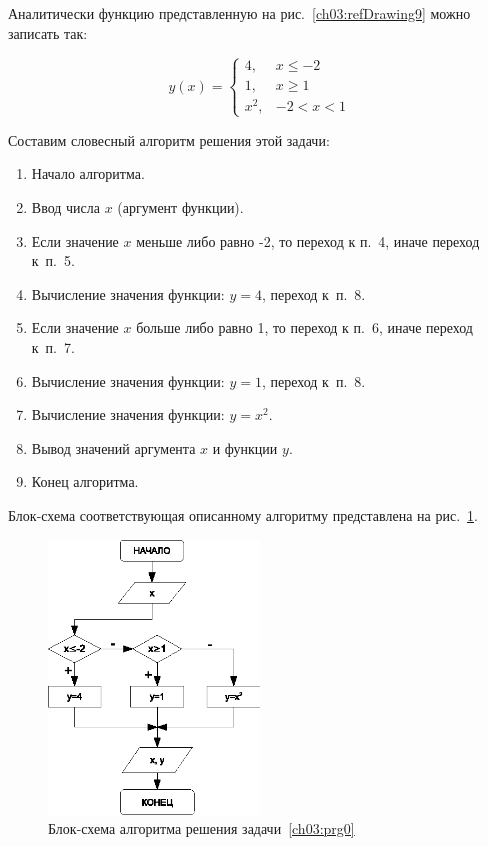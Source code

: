 Аналитически функцию представленную на рис.~\ref{ch03:refDrawing9} можно записать так:

\begin{equation*}
y(x)=\left\{\begin{matrix}
4, & x\leqslant -2\\
1, & x\geqslant 1\\
x^2, & -2<x<1
\end{matrix}\right.
\end{equation*}

Составим словесный алгоритм решения этой задачи:

\begin{enumerate}
\item Начало алгоритма.
\item Ввод числа $x$ (аргумент функции).
\item Если значение $x$ меньше либо равно -2, то переход к п.~4, иначе переход к~п.~5.
\item Вычисление значения функции: $y=4$, переход к~п.~8.
\item Если значение $x$ больше либо равно 1, то переход к п.~6, иначе переход к~п.~7.
\item Вычисление значения функции: $y=1$, переход к~п.~8.
\item Вычисление значения функции: $y=x^2$.
\item Вывод значений аргумента $x$ и функции $y$.
\item Конец алгоритма.
\end{enumerate}

Блок-схема соответствующая описанному алгоритму представлена на рис.~\ref{ch03:refDrawing10}.

\begin{figure}[htb]
\begin{center}
\includegraphics[width=0.5\textwidth]{img/ris_3_11}
\caption{Блок-схема алгоритма решения задачи~\ref{ch03:prg0}}
\label{ch03:refDrawing10}
\end{center}
\end{figure}


